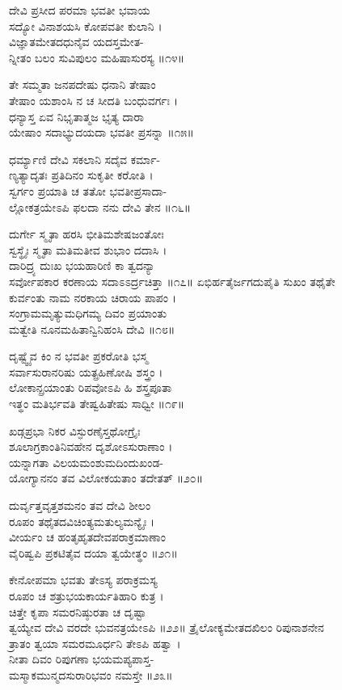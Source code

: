      ದೇವಿ ಪ್ರಸೀದ ಪರಮಾ ಭವತೀ ಭವಾಯ\\
ಸದ್ಯೋ ವಿನಾಶಯಸಿ ಕೋಪವತೀ ಕುಲಾನಿ ।\\
     ವಿಜ್ಞಾತಮೇತದಧುನೈವ ಯದಸ್ತಮೇತ-\\
ನ್ನೀತಂ ಬಲಂ ಸುವಿಪುಲಂ ಮಹಿಷಾಸುರಸ್ಯ ॥೧೪॥

     ತೇ ಸಮ್ಮತಾ ಜನಪದೇಷು ಧನಾನಿ ತೇಷಾಂ\\
ತೇಷಾಂ ಯಶಾಂಸಿ ನ ಚ ಸೀದತಿ ಬಂಧುವರ್ಗಃ ।\\
     ಧನ್ಯಾಸ್ತ ಏವ ನಿಭೃತಾತ್ಮಜ ಭೃತ್ಯ ದಾರಾ\\
ಯೇಷಾಂ ಸದಾಭ್ಯುದಯದಾ ಭವತೀ ಪ್ರಸನ್ನಾ ॥೧೫॥

     ಧರ್ಮ್ಯಾಣಿ ದೇವಿ ಸಕಲಾನಿ ಸದೈವ ಕರ್ಮಾ-\\
ಣ್ಯತ್ಯಾದೃತಃ ಪ್ರತಿದಿನಂ ಸುಕೃತೀ ಕರೋತಿ ।\\
     ಸ್ವರ್ಗಂ ಪ್ರಯಾತಿ ಚ ತತೋ ಭವತೀಪ್ರಸಾದಾ-\\
ಲ್ಲೋಕತ್ರಯೇಽಪಿ ಫಲದಾ ನನು ದೇವಿ ತೇನ ॥೧೬॥

     ದುರ್ಗೇ ಸ್ಮೃತಾ ಹರಸಿ ಭೀತಿಮಶೇಷಜಂತೋಃ\\
ಸ್ವಸ್ಥೈಃ ಸ್ಮೃತಾ ಮತಿಮತೀವ ಶುಭಾಂ ದದಾಸಿ ।\\
     ದಾರಿದ್ರ್ಯ ದುಃಖ ಭಯಹಾರಿಣಿ ಕಾ ತ್ವದನ್ಯಾ\\
ಸರ್ವೋಪಕಾರ ಕರಣಾಯ ಸದಾಽಽರ್ದ್ರಚಿತ್ತಾ ॥೧೭॥
\newpage
     ಏಭಿರ್ಹತೈರ್ಜಗದುಪೈತಿ ಸುಖಂ ತಥೈತೇ\\
ಕುರ್ವಂತು ನಾಮ ನರಕಾಯ ಚಿರಾಯ ಪಾಪಂ ।\\
     ಸಂಗ್ರಾಮಮೃತ್ಯುಮಧಿಗಮ್ಯ ದಿವಂ ಪ್ರಯಾಂತು\\
ಮತ್ವೇತಿ ನೂನಮಹಿತಾನ್ವಿನಿಹಂಸಿ ದೇವಿ ॥೧೮॥

     ದೃಷ್ಟ್ವೈವ ಕಿಂ ನ ಭವತೀ ಪ್ರಕರೋತಿ ಭಸ್ಮ\\
ಸರ್ವಾಸುರಾನರಿಷು ಯತ್ಪ್ರಹಿಣೋಷಿ ಶಸ್ತ್ರಂ ।\\
     ಲೋಕಾನ್ಪ್ರಯಾಂತು ರಿಪವೋಽಪಿ ಹಿ ಶಸ್ತ್ರಪೂತಾ\\
ಇತ್ಥಂ ಮತಿರ್ಭವತಿ ತೇಷ್ವಹಿತೇಷು ಸಾಧ್ವೀ ॥೧೯॥

     ಖಡ್ಗಪ್ರಭಾ ನಿಕರ ವಿಸ್ಫುರಣೈಸ್ತಥೋಗ್ರೈಃ\\
ಶೂಲಾಗ್ರಕಾಂತಿನಿವಹೇನ ದೃಶೋಽಸುರಾಣಾಂ ।\\
     ಯನ್ನಾಗತಾ ವಿಲಯಮಂಶುಮದಿಂದುಖಂಡ-\\
ಯೋಗ್ಯಾನನಂ ತವ ವಿಲೋಕಯತಾಂ ತದೇತತ್ ॥೨೦॥

     ದುರ್ವೃತ್ತವೃತ್ತಶಮನಂ ತವ ದೇವಿ ಶೀಲಂ\\
ರೂಪಂ ತಥೈತದವಿಚಿಂತ್ಯಮತುಲ್ಯಮನ್ಯೈಃ ।\\
     ವೀರ್ಯಂ ಚ ಹಂತೃಹೃತದೇವಪರಾಕ್ರಮಾಣಾಂ\\
ವೈರಿಷ್ವಪಿ ಪ್ರಕಟಿತೈವ ದಯಾ ತ್ವಯೇತ್ಥಂ ॥೨೧॥

     ಕೇನೋಪಮಾ ಭವತು ತೇಽಸ್ಯ ಪರಾಕ್ರಮಸ್ಯ\\
ರೂಪಂ ಚ ಶತ್ರುಭಯಕಾರ್ಯತಿಹಾರಿ ಕುತ್ರ ।\\
     ಚಿತ್ತೇ ಕೃಪಾ ಸಮರನಿಷ್ಠುರತಾ ಚ ದೃಷ್ಟಾ\\
ತ್ವಯ್ಯೇವ ದೇವಿ ವರದೇ ಭುವನತ್ರಯೇಽಪಿ ॥೨೨॥
\newpage
     ತ್ರೈಲೋಕ್ಯಮೇತದಖಿಲಂ ರಿಪುನಾಶನೇನ\\
ತ್ರಾತಂ ತ್ವಯಾ ಸಮರಮೂರ್ಧನಿ ತೇಽಪಿ ಹತ್ವಾ ।\\
     ನೀತಾ ದಿವಂ ರಿಪುಗಣಾ ಭಯಮಪ್ಯಪಾಸ್ತ-\\
ಮಸ್ಮಾಕಮುನ್ಮದಸುರಾರಿಭವಂ ನಮಸ್ತೇ ॥೨೩॥

